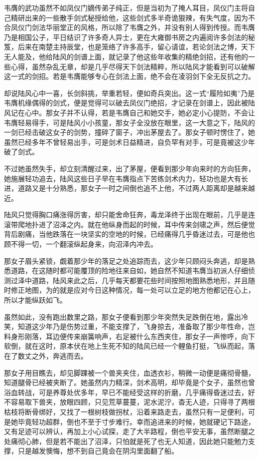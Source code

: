 韦膺的武功虽然不如凤仪门嫡传弟子纯正，但是当初为了掩人耳目，凤仪门主将自己精研出来的一些散手剑式秘授给他，这些剑式多半奇诡狠辣，有失气度，因为不合凤仪门剑法华丽堂正的风格，所以除了韦膺之外，并没有别人得到传授。而韦膺乃是相国公子，平日结识了许多奇人异士，更在大雍御书房之内遍阅许多剑法的秘笈，后来在南楚主持辰堂，也是笼络了许多高手，留心请谊，若论剑法之博，天下无人能及，他给陆风的剑谱上面，就记录了他这些年收集的精绝剑招，还有他的一些心得，虽然杂乱无章，却是几乎尽得天下剑法精粹，所以陆风才能看到可以破解这一式的剑招。若是韦膺能够专心在剑法上面，绝不会在凌羽剑下全无反抗之力。

却说陆风心中一喜，长剑斜挑，举重若轻，便如奇兵突出。这一式“履险如夷”乃是韦膺机缘偶得的剑式，便是觉得可以破去凤仪门绝招，才记录在剑谱上，因此被陆风记在心中。那女子并不认得，若是韦膺自己和她交手，她必定小心提防，不会让韦膺轻易得手，可是陆风小小孩童，那女子全没放在眼里，这一大意之下，陆风的一剑已经击破这女子的剑势，撞碎了窗子，冲出茅屋去了。那女子顿时愣住了，她虽然已经多年不曾轻易出手，可是剑术日益精进，自负罕有对手，可是竟被这少年破了剑式。

不过她虽然失手，却立刻清醒过来，出了茅屋，便看到那少年向来时的方向狂奔，她施展轻功追去，陆风这些日子早在韦膺指点下苦练剑术内力，轻功也是大有长进，道路又是十分熟悉，那女子一时之间倒也追不上他，不过两人距离却是越来越近。

陆风只觉得胸口痛涨得厉害，却只能舍命狂奔，毒龙泽终于出现在眼前，几乎是连滚带爬地扑进了沼泽之内。就在他纵身而起的时候，耳中传来剑啸之声，然后便觉背后剧痛，当他跌落在一块坚实的空地的时候，已经痛得几乎昏迷过去，可是他也顾不得一切，一个翻滚纵起身来，向沼泽内冲去。

那女子眉头紧锁，觑着那少年的落足之处追踪而去，这少年只顾闷头奔逃，却是熟悉道路，在这随时都可能覆顶的险地往来自如，她自然不知道韦膺当初派人仔细侦测过泽中道路，陆风来此之后，几乎每天都要花些时间按照地图熟悉地形，并且随时修正地图，为的就是应对今日这种情况，每一处可以立足的地方他都记在心上，所以才能纵跃如飞。

虽然如此，没有跑出数里之路，那女子便看到那少年突然失足跌倒在地，露出冷笑，知道这少年乃是伤势过重，不能支撑了，飞身掠去，准备取了那少年性命，岂料身形刚落，耳边便传来崩簧响声，右足被什么东西夹住，那女子一声惨呼，向下软倒，就在这时，原本伏在地上生死不知的陆风已经一个鲤鱼打挺，飞纵而起，落在了数丈之外，奔逃而去。

那女子用目瞧去，却见脚踝被一个兽夹夹住，血透衣衫，稍微一动便是痛彻骨髓，知道腿骨已经被夹断了。她虽然内力精深，剑术高明，却毕竟是个女子，虽然也曾浴血转战，可是养尊处优多年，早已不能经受这样的折磨，几乎痛得昏迷过去，好不容易取下兽夹，放眼四顾，只见荒草蔓蔓，泥水泥泞，杳无人迹，只得寻了两根枯枝将断骨绑好，又找了一根树枝做拐杖，沿着来路走去，虽然只有一足便利，可是她毕竟轻功超群，倒也不至于寸步难行。幸而追进来的时候，她就硬记下路途，又有足迹可以辨认，再加上小心试探，走了大半路程，倒也平安无事，虽然断腿之处痛彻心肺，但是若不能出了沼泽，只怕就是死了也无人知道，因此她只能勉力支撑，只是越发懊悔，想不到自己竟会在阴沟里面翻了船。

